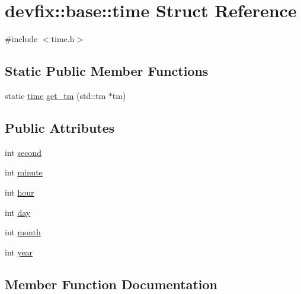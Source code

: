 \hypertarget{structdevfix_1_1base_1_1time}{}\section{devfix\+:\+:base\+:\+:time Struct Reference}
\label{structdevfix_1_1base_1_1time}


{\ttfamily \#include $<$time.\+h$>$}

\subsection*{Static Public Member Functions}
\begin{DoxyCompactItemize}
\item 
static \hyperlink{structdevfix_1_1base_1_1time}{time} \hyperlink{structdevfix_1_1base_1_1time_a14d0b48fe09bf355aa64f3a5e2c60418}{get\+\_\+tm} (std\+::tm $\ast$tm)
\end{DoxyCompactItemize}
\subsection*{Public Attributes}
\begin{DoxyCompactItemize}
\item 
int \hyperlink{structdevfix_1_1base_1_1time_a7a39795f67f0e3f1bea48cc790ef0bdb}{second}
\item 
int \hyperlink{structdevfix_1_1base_1_1time_a2e36d9cbccf1144093e09674d4d9db24}{minute}
\item 
int \hyperlink{structdevfix_1_1base_1_1time_a82a691ea0cc8b65beac2e3d3b4254c55}{hour}
\item 
int \hyperlink{structdevfix_1_1base_1_1time_ae5a080003e7020960c31e47cf30a21ba}{day}
\item 
int \hyperlink{structdevfix_1_1base_1_1time_a781a7e9d96a916305e1a9e2c261c1a0f}{month}
\item 
int \hyperlink{structdevfix_1_1base_1_1time_a28e7dfbcd21ff6c915f66497b86168d9}{year}
\end{DoxyCompactItemize}


\subsection{Member Function Documentation}
\mbox{\label{structdevfix_1_1base_1_1time_a14d0b48fe09bf355aa64f3a5e2c60418}} 
